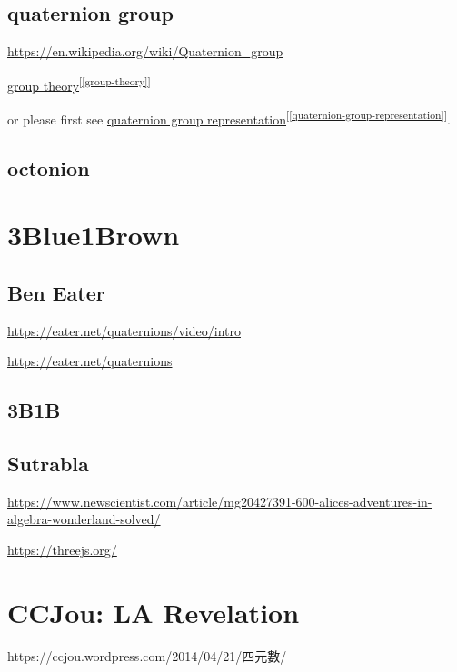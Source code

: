 \documentclass[
]{book}
\theoremstyle{definition}
\theoremstyle{definition}
\theoremstyle{definition}
\theoremstyle{definition}
\theoremstyle{remark}
\begin{document}
\subsection{quaternion group}\label{quaternion-group}

\url{https://en.wikipedia.org/wiki/Quaternion_group}

\hyperref[group-theory]{group theory}\textsuperscript{{[}\ref{group-theory}{]}}

or please first see \hyperref[quaternion-group-representation]{quaternion group representation}\textsuperscript{{[}\ref{quaternion-group-representation}{]}}.

\subsection{octonion}\label{octonion}

\section{3Blue1Brown}\label{blue1brown}

\subsection{Ben Eater}\label{ben-eater}

\url{https://eater.net/quaternions/video/intro}

\url{https://eater.net/quaternions}

\subsection{3B1B}\label{b1b}

\subsection{Sutrabla}\label{sutrabla}

\url{https://www.newscientist.com/article/mg20427391-600-alices-adventures-in-algebra-wonderland-solved/}

\url{https://threejs.org/}

\section{CCJou: LA Revelation}\label{ccjou-la-revelation}

\begin{CJK}{UTF8}{bsmi}
https://ccjou.wordpress.com/2014/04/21/四元數/
\end{CJK}
\end{document}
